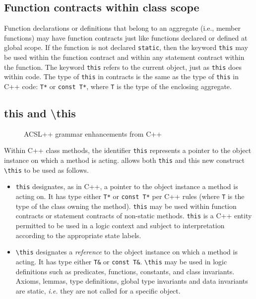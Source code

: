 
\subsection{Function contracts within class scope}

Function declarations or definitions that belong to an aggregate (i.e., member functions) may have function
contracts just like functions declared or defined at global scope. If the function is not declared \lstinline|static|, then
the keyword \lstinline|this| may be used within the function
contract and within any statement contract within the 
function. The keyword \lstinline|this| refers to the current
object, just as \lstinline|this| does within \lang code.
The type of \lstinline|this| in contracts is the same as the type of \lstinline|this| in C++ code: \lstinline|T*| or \lstinline|const T*|, where \lstinline|T| is the type of the enclosing aggregate.


\subsection{\textbf{this} and \textbf{\textbackslash this}}


\begin{figure}[htp]
\begin{cadre}

\end{cadre}
\caption{ACSL++ grammar enhancements from C++}
\label{fig:gram:this}
\end{figure}

Within C++ class methods, the identifier \lstinline|this| represents a
pointer to the object instance on which a method is acting. \NAME
allows both \lstinline|this| and this new construct \lstinline|\this| 
to be used as follows.
\begin{itemize}
\item \lstinline|this| designates, as in C++, a pointer to the object
instance a method is acting on. It has type either \lstinline|T*|
or \lstinline|const T*| per C++ rules (where \lstinline|T| is the type
of the class owning the method). \lstinline|this| may be used
within function contracts or statement contracts of non-static methods.
\lstinline|this| is a C++ entity permitted to be used in a logic context
and subject to interpretation according to the appropriate state labels.

\item \lstinline|\this| designates a \textit{reference} to the object
  instance on which a method is acting. It has type either
  \lstinline|T&| or \lstinline|const T&|.  \lstinline|\this| may be
  used in logic definitions such as predicates, functions, constants,
  and class invariants. Axioms, lemmas, type definitions, global type
  invariants and data invariants are static, {\it i.e.} they
  are not called for a specific object.

\end{itemize}


